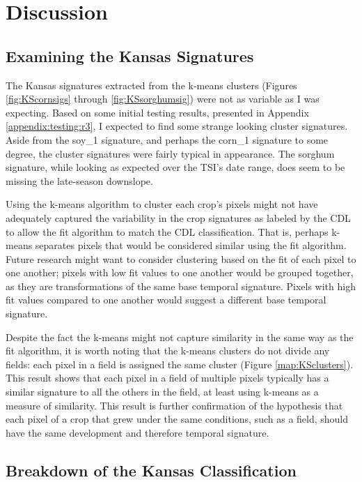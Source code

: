 \chapter{Discussion}

\section{Examining the Kansas Signatures}

The Kansas signatures extracted from the k-means clusters (Figures \ref{fig:KScornsigs} through \ref{fig:KSsorghumsig}) were not as variable as I was expecting. Based on some initial testing results, presented in Appendix \ref{appendix:testing:r3}, I expected to find some strange looking cluster signatures. Aside from the soy\_1 signature, and perhaps the corn\_1 signature to some degree, the cluster signatures were fairly typical in appearance. The sorghum signature, while looking as expected over the TSI's date range, does seem to be missing the late-season downslope.

Using the k-means algorithm to cluster each crop's pixels might not have adequately captured the variability in the crop signatures as labeled by the CDL to allow the fit algorithm to match the CDL classification. That is, perhaps k-means separates pixels that would be considered similar using the fit algorithm. Future research might want to consider clustering based on the fit of each pixel to one another; pixels with low fit values to one another would be grouped together, as they are transformations of the same base temporal signature. Pixels with high fit values compared to one another would suggest a different base temporal signature.

Despite the fact the k-means might not capture similarity in the same way as the fit algorithm, it is worth noting that the k-means clusters do not divide any fields: each pixel in a field is assigned the same cluster (Figure \ref{map:KSclusters}). This result shows that each pixel in a field of multiple pixels typically has a similar signature to all the others in the field, at least using k-means as a measure of similarity. This result is further confirmation of the hypothesis that each pixel of a crop that grew under the same conditions, such as a field, should have the same development and therefore temporal signature.

\section{Breakdown of the Kansas Classification}

